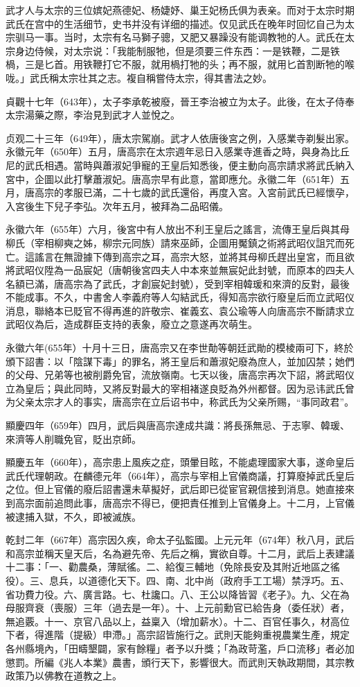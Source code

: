 武才人与太宗的三位嫔妃燕德妃、杨婕妤、巢王妃杨氏俱为表亲。而对于太宗时期武氏在宫中的生活细节，史书并没有详细的描述。仅见武氏在晚年时回忆自己为太宗驯马一事。当时，太宗有名马獅子骢，又肥又暴躁没有能调教牠的人。武氏在太宗身边侍候，对太宗说：「我能制服牠，但是须要三件东西：一是铁鞭，二是铁楇，三是匕首。用铁鞭打它不服，就用楇打牠的头；再不服，就用匕首割断牠的喉咙。」武氏稱太宗壮其之志。複自稱嘗侍太宗，得其書法之妙。

貞觀十七年（643年），太子李承乾被廢，晉王李治被立为太子。此後，在太子侍奉太宗湯藥之際，李治見到武才人並悅之。

贞观二十三年（649年），唐太宗駕崩。武才人依唐後宮之例，入感業寺剃髮出家。永徽元年（650年）五月，唐高宗在太宗週年忌日入感業寺進香之時，與身為比丘尼的武氏相遇。當時與蕭淑妃爭寵的王皇后知悉後，便主動向高宗請求將武氏納入宮中，企圖以此打擊蕭淑妃。唐高宗早有此意，當即應允。永徽二年（651年）五月，唐高宗的孝服已滿，二十七歲的武氏還俗，再度入宮。入宮前武氏已經懷孕，入宮後生下兒子李弘。次年五月，被拜為二品昭儀。

永徽六年（655年）六月，後宮中有人放出不利王皇后之謠言，流傳王皇后與其母柳氏（宰相柳奭之姊，柳宗元同族）請來巫師，企圖用魘鎮之術將武昭仪詛咒而死亡。這謠言在無證據下傳到高宗之耳，高宗大怒，並將其母柳氏趕出皇宮，而且欲將武昭仪陞為一品宸妃（唐朝後宮四夫人中本來並無宸妃此封號，而原本的四夫人名額已滿，唐高宗為了武氏，才創宸妃封號），受到宰相韓瑗和來濟的反對，最後不能成事。不久，中書舍人李義府等人勾結武氏，得知高宗欲行廢皇后而立武昭仪消息，聯絡本已貶官不得再進的許敬宗、崔義玄、袁公瑜等人向唐高宗不斷請求立武昭仪為后，造成群臣支持的表象，廢立之意遂再次萌生。

永徽六年(655年）十月十三日，唐高宗又在李世勣等朝廷武勛的模棱兩可下，終於頒下詔書：以「陰謀下毒」的罪名，將王皇后和蕭淑妃廢為庶人，並加囚禁；她們的父母、兄弟等也被削爵免官，流放嶺南。七天以後，唐高宗再次下詔，將武昭仪立為皇后；與此同時，又將反對最大的宰相褚遂良貶為外州都督。因为忌讳武氏曾为父亲太宗才人的事实，唐高宗在立后诏书中，称武氏为父亲所赐，“事同政君”。

顯慶四年（659年）四月，武后與唐高宗達成共識：將長孫無忌、于志寧、韓瑗、來濟等人削職免官，貶出京師。

顯慶五年（660年），高宗患上風疾之症，頭暈目眩，不能處理國家大事，遂命皇后武氏代理朝政。在麟德元年（664年），高宗与宰相上官儀商議，打算廢掉武氏皇后之位。但上官儀的廢后詔書還未草擬好，武后即已從宦官親信接到消息。她直接來到高宗面前追問此事，唐高宗不得已，便把責任推到上官儀身上。十二月，上官儀被逮捕入獄，不久，即被滅族。

乾封二年（667年）高宗因久疾，命太子弘監國。上元元年（674年）秋八月，武后和高宗並稱天皇天后，名為避先帝、先后之稱，實欲自尊。十二月，武后上表建議十二事：「一、勸農桑，薄賦徭。二、給復三輔地（免除長安及其附近地區之徭役）。三、息兵，以道德化天下。四、南、北中尚（政府手工工場）禁浮巧。五、省功費力役。六、廣言路。七、杜讒口。八、王公以降皆習《老子》。九、父在為母服齊衰（喪服）三年（過去是一年）。十、上元前勳官已給告身（委任狀）者，無追覈。十一、京官八品以上，益稟入（增加薪水）。十二、百官任事久，材高位下者，得進階（提級）申滯。」高宗詔皆施行之。武則天能夠重視農業生產，規定各州縣境內，「田疇墾闢，家有餘糧」者予以升獎；「為政苛濫，戶口流移」者必加懲罰。所編《兆人本業》農書，頒行天下，影響很大。而武則天執政期間，其宗教政策乃以佛教在道教之上。

